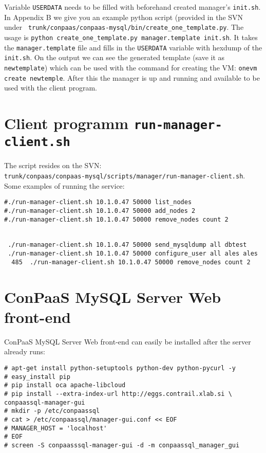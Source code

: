 \documentclass[a4paper,10pt]{article}
\begin{document}
Variable {\tt USERDATA} needs to be filled with beforehand created manager's {\tt init.sh}. In Appendix B we give you an example python script (provided in the SVN under {\tt   
trunk/conpaas/conpaas-mysql/bin/create\_one\_template.py}.  The usage is {\tt python create\_one\_template.py manager.template init.sh}. It takes the {\tt manager.template} file and fills in the {\tt USERDATA} variable with hexdump of the {\tt init.sh}. On the output we can see the generated template (save it as {\tt newtemplate}) which can be used with the command for creating the VM: {\tt onevm create newtemple}. After this the manager is up and running and available to be used with the client program.

\section{Client programm {\tt run-manager-client.sh}}

The script resides on the SVN: \\ {\tt trunk/conpaas/conpaas-mysql/scripts/manager/run-manager-client.sh}.
Some examples of running the service:

\begin{Verbatim}[frame=single]
#./run-manager-client.sh 10.1.0.47 50000 list_nodes
#./run-manager-client.sh 10.1.0.47 50000 add_nodes 2
#./run-manager-client.sh 10.1.0.47 50000 remove_nodes count 2


 ./run-manager-client.sh 10.1.0.47 50000 send_mysqldump all dbtest 
 ./run-manager-client.sh 10.1.0.47 50000 configure_user all ales ales
  485  ./run-manager-client.sh 10.1.0.47 50000 remove_nodes count 2

\end{Verbatim}

\section{ConPaaS MySQL Server Web front-end}
\label{sec:web-front-end}
ConPaaS MySQL Server Web front-end can easily be installed after the server already runs: 

\begin{Verbatim}[frame=single]
# apt-get install python-setuptools python-dev python-pycurl -y
# easy_install pip
# pip install oca apache-libcloud
# pip install --extra-index-url http://eggs.contrail.xlab.si \
conpaassql-manager-gui
# mkdir -p /etc/conpaassql
# cat > /etc/conpaassql/manager-gui.conf << EOF
# MANAGER_HOST = 'localhost'
# EOF
# screen -S conpaasssql-manager-gui -d -m conpaassql_manager_gui
\end{Verbatim}
\end{document}
